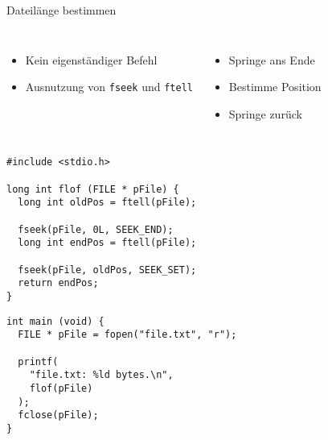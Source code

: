 \begin{frame}[fragile]{Dateilänge bestimmen}
%
\vspace{-5pt}
\begin{columns}[T]
\begin{itemize}
\item Kein eigenständiger Befehl
\item Ausnutzung von \texttt{fseek} und \texttt{ftell}
\end{itemize}
%
\begin{itemize}
\item Springe ans Ende
\item Bestimme Position 
\item Springe zurück
\end{itemize}
\end{columns}
%
\begin{tcbraster}[raster columns=2,
                  raster equal height,
                  nobeforeafter
                 ]
\begin{codebox}
\begin{verbatim}
#include <stdio.h>

long int flof (FILE * pFile) {
  long int oldPos = ftell(pFile);
  
  fseek(pFile, 0L, SEEK_END);
  long int endPos = ftell(pFile);
  
  fseek(pFile, oldPos, SEEK_SET);
  return endPos;
}
\end{verbatim}
\end{codebox}
%
\begin{codebox}[... Fortsetzung]
\begin{verbatim}
int main (void) {
  FILE * pFile = fopen("file.txt", "r");  

  printf(
    "file.txt: %ld bytes.\n",
    flof(pFile)
  );
  fclose(pFile);
}
\end{verbatim}
\end{codebox}
\end{tcbraster}
%
\end{frame}

